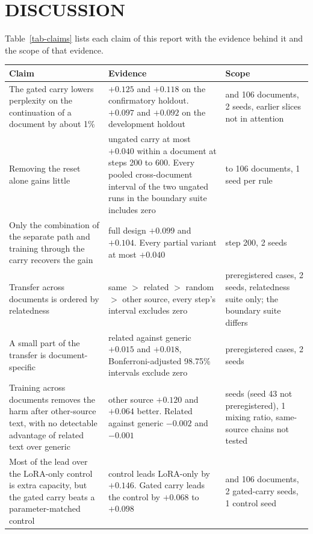 \documentclass[12pt,a4paper]{report}
\begin{document}
\chapter{DISCUSSION}

Table~\ref{tab-claims} lists each claim of this report with the evidence behind it and the scope of that evidence.

\begin{table}[H]
  \centering
  \footnotesize
  \begin{tabularx}{\linewidth}{>{\raggedright\arraybackslash}p{4.6cm}>{\raggedright\arraybackslash}X>{\raggedright\arraybackslash}p{2.6cm}}
    \toprule
    Claim & Evidence & Scope \\
    \midrule
    The gated carry lowers perplexity on the continuation of a document by about 1\% & $+0.125$ and $+0.118$ on the confirmatory holdout. $+0.097$ and $+0.092$ on the development holdout & 73 and 106 documents, 2 seeds, earlier slices not in attention \\
    Removing the reset alone gains little & ungated carry at most $+0.040$ within a document at steps 200 to 600. Every pooled cross-document interval of the two ungated runs in the boundary suite includes zero & 24 to 106 documents, 1 seed per rule \\
    Only the combination of the separate path and training through the carry recovers the gain & full design $+0.099$ and $+0.104$. Every partial variant at most $+0.040$ & step 200, 2 seeds \\
    Transfer across documents is ordered by relatedness & same $>$ related $>$ random $>$ other source, every step's interval excludes zero & 200 preregistered cases, 2 seeds, relatedness suite only; the boundary suite differs \\
    A small part of the transfer is document-specific & related against generic $+0.015$ and $+0.018$, Bonferroni-adjusted 98.75\% intervals exclude zero & 200 preregistered cases, 2 seeds \\
    Training across documents removes the harm after other-source text, with no detectable advantage of related text over generic & other source $+0.120$ and $+0.064$ better. Related against generic $-0.002$ and $-0.001$ & 2 seeds (seed 43 not preregistered), 1 mixing ratio, same-source chains not tested \\
    Most of the lead over the LoRA-only control is extra capacity, but the gated carry beats a parameter-matched control & control leads LoRA-only by $+0.146$. Gated carry leads the control by $+0.068$ to $+0.098$ & 73 and 106 documents, 2 gated-carry seeds, 1 control seed \\

\end{tabularx}
\end{table}
\end{document}
